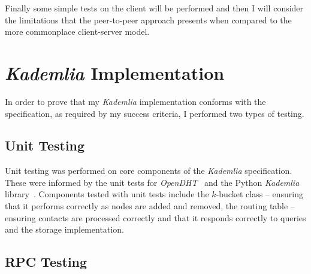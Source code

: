 \documentclass[12pt,notitlepage,a4paper]{report}
\newcommand{\kademlia}{\emph{Kademlia}}
\newcommand{\K}{$k$}
\begin{document}
	Finally some simple tests on the client will be performed and then I will consider the limitations that the peer-to-peer approach presents when compared to the more commonplace client-server model.
	
	\section{\kademlia{} Implementation}
	In order to prove that my \kademlia{} implementation conforms with the specification, as required by my success criteria, I performed two types of testing.
	
	\subsection{Unit Testing}
	Unit testing was performed on core components of the \kademlia{} specification. These were informed by the unit tests for \emph{OpenDHT}~\cite{opendht} and the Python \kademlia{} library~\cite{pykademlia}. Components tested with unit tests include the \K-bucket class -- ensuring that it performs correctly as nodes are added and removed, the routing table -- ensuring contacts are processed correctly and that it responds correctly to queries and the storage implementation.
	
	\subsection{RPC Testing}
\end{document}
